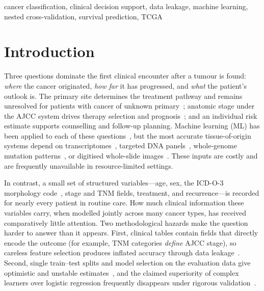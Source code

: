 \documentclass[conference]{IEEEtran}
\begin{document}
\begin{IEEEkeywords}
cancer classification, clinical decision support, data leakage, machine learning, nested cross-validation, survival prediction, TCGA
\end{IEEEkeywords}

\section{Introduction}
Three questions dominate the first clinical encounter after a tumour is found: \emph{where} the cancer originated, \emph{how far} it has progressed, and \emph{what} the patient's outlook is. The primary site determines the treatment pathway and remains unresolved for patients with cancer of unknown primary~\cite{varadhachary2014}; anatomic stage under the AJCC system drives therapy selection and prognosis~\cite{amin2017}; and an individual risk estimate supports counselling and follow-up planning. Machine learning (ML) has been applied to each of these questions~\cite{cruz2006,kourou2015}, but the most accurate tissue-of-origin systems depend on transcriptomes~\cite{grewal2019}, targeted DNA panels~\cite{penson2020}, whole-genome mutation patterns~\cite{jiao2020}, or digitised whole-slide images~\cite{lu2021}. These inputs are costly and are frequently unavailable in resource-limited settings.

In contrast, a small set of structured variables---age, sex, the ICD-O-3 morphology code~\cite{fritz2000}, stage and TNM fields, treatment, and recurrence---is recorded for nearly every patient in routine care. How much clinical information these variables carry, when modelled jointly across many cancer types, has received comparatively little attention. Two methodological hazards make the question harder to answer than it appears. First, clinical tables contain fields that directly encode the outcome (for example, TNM categories \emph{define} AJCC stage), so careless feature selection produces inflated accuracy through data leakage~\cite{kaufman2012,kapoor2023}. Second, single train--test splits and model selection on the evaluation data give optimistic and unstable estimates~\cite{cawley2010}, and the claimed superiority of complex learners over logistic regression frequently disappears under rigorous validation~\cite{christodoulou2019}.
\end{document}
